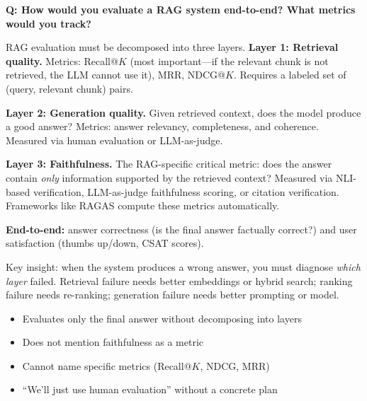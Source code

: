 \begin{interviewq}
\end{interviewq}

\bigskip

\begin{interviewq}
\textbf{Q: How would you evaluate a RAG system end-to-end? What metrics would
you track?}

 \quad {} \quad \badgefreq{\freqhigh}

\stronganswer
RAG evaluation must be decomposed into three layers.  \textbf{Layer 1:
Retrieval quality.}  Metrics: Recall@$K$ (most important---if the relevant
chunk is not retrieved, the LLM cannot use it), MRR, NDCG@$K$.  Requires a
labeled set of (query, relevant chunk) pairs.

\textbf{Layer 2: Generation quality.}  Given retrieved context, does the model
produce a good answer?  Metrics: answer relevancy, completeness, and coherence.
Measured via human evaluation or LLM-as-judge.

\textbf{Layer 3: Faithfulness.}  The RAG-specific critical metric: does the
answer contain \emph{only} information supported by the retrieved context?
Measured via NLI-based verification, LLM-as-judge faithfulness scoring, or
citation verification.  Frameworks like RAGAS compute these metrics
automatically.

\textbf{End-to-end:} answer correctness (is the final answer factually
correct?) and user satisfaction (thumbs up/down, CSAT scores).

Key insight: when the system produces a wrong answer, you must diagnose
\emph{which layer} failed.  Retrieval failure needs better embeddings or hybrid
search; ranking failure needs re-ranking; generation failure needs better
prompting or model.

\redflags
\begin{itemize}
    \item Evaluates only the final answer without decomposing into layers
    \item Does not mention faithfulness as a metric
    \item Cannot name specific metrics (Recall@$K$, NDCG, MRR)
    \item ``We'll just use human evaluation'' without a concrete plan
\end{itemize}



\end{interviewq}

